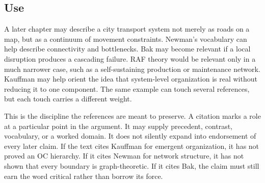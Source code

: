 \documentclass[11pt,a4paper,openany]{book}
\begin{document}
\subsection{Use}
A later chapter may describe a city transport system not merely as roads on a map, but as a continuum of movement constraints. Newman's vocabulary can help describe connectivity and bottlenecks. Bak may become relevant if a local disruption produces a cascading failure. RAF theory would be relevant only in a much narrower case, such as a self-sustaining production or maintenance network. Kauffman may help orient the idea that system-level organization is real without reducing it to one component. The same example can touch several references, but each touch carries a different weight. \cite{kauffman_autocatalytic,raf_networks}\par
This is the discipline the references are meant to preserve. A citation marks a role at a particular point in the argument. It may supply precedent, contrast, vocabulary, or a worked domain. It does not silently expand into endorsement of every later claim. If the text cites Kauffman for emergent organization, it has not proved an OC hierarchy. If it cites Newman for network structure, it has not shown that every boundary is graph-theoretic. If it cites Bak, the claim must still earn the word critical rather than borrow its force.\par
\end{document}
